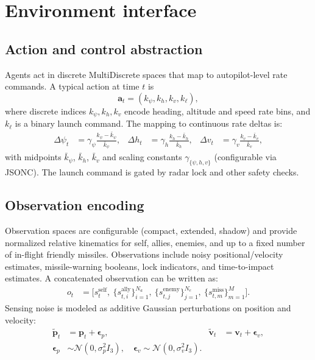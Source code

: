 \documentclass[11pt]{article}
\begin{document}
\section{Environment interface}
\subsection{Action and control abstraction}
Agents act in discrete MultiDiscrete spaces that map to autopilot-level rate commands. A typical action at time $t$ is
\[
\mathbf{a}_t = (k_\psi, k_h, k_v, k_\ell),
\]
where discrete indices $k_\psi,k_h,k_v$ encode heading, altitude and speed rate bins, and $k_\ell$ is a binary launch command. The mapping to continuous rate deltas is:
\begin{align}
\Delta \psi_t &= \gamma_\psi \frac{k_\psi-\bar{k}_\psi}{\bar{k}_\psi}, &
\Delta h_t &= \gamma_h \frac{k_h-\bar{k}_h}{\bar{k}_h}, &
\Delta v_t &= \gamma_v \frac{k_v-\bar{k}_v}{\bar{k}_v}, \label{eq:action_map}
\end{align}
with midpoints $\bar{k}_\psi$, $\bar{k}_h$, $\bar{k}_v$ and scaling constants $\gamma_{\{\psi,h,v\}}$ (configurable via JSONC). The launch command is gated by radar lock and other safety checks.

\subsection{Observation encoding}
Observation spaces are configurable (compact, extended, shadow) and provide normalized relative kinematics for self, allies, enemies, and up to a fixed number of in-flight friendly missiles. Observations include noisy positional/velocity estimates, missile-warning booleans, lock indicators, and time-to-impact estimates. A concatenated observation can be written as:
\begin{align}
o_t &= \big[s^{\text{self}}_t,\ \{s^{\text{ally}}_{t,i}\}_{i=1}^{N_a},\ \{s^{\text{enemy}}_{t,j}\}_{j=1}^{N_e},\ \{s^{\text{miss}}_{t,m}\}_{m=1}^{M}\big]. \label{eq:obs_concat}
\end{align}
Sensing noise is modeled as additive Gaussian perturbations on position and velocity:
\begin{align}
\tilde{\mathbf{p}}_{t} &= \mathbf{p}_{t} + \boldsymbol{\epsilon}_p,&
\tilde{\mathbf{v}}_{t} &= \mathbf{v}_{t} + \boldsymbol{\epsilon}_v, \\
\boldsymbol{\epsilon}_p &\sim \mathcal{N}(0,\sigma_p^2 I_3),\quad
\boldsymbol{\epsilon}_v \sim \mathcal{N}(0,\sigma_v^2 I_3). \label{eq:sensing_noise}
\end{align}
\end{document}
